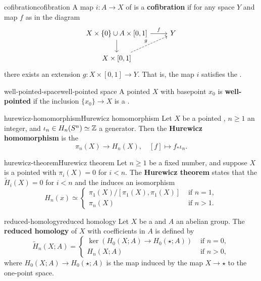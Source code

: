\begin{topic}{cofibration}{cofibration}
    A map $i : A \to X$ of  is a \textbf{cofibration} if for any space $Y$ and map $f$ as in the diagram
    \[ \begin{tikzcd} X \times \{ 0 \} \cup A \times [0, 1] \arrow{r}{f} \arrow{d} & Y \\ X \times [0, 1] \arrow[dashed]{ur}{g} \end{tikzcd} \]
    there exists an extension $g : X \times [0, 1] \to Y$. That is, the map $i$ satisfies the .
\end{topic}

\begin{topic}{well-pointed-space}{well-pointed space}
    A pointed  $X$ with basepoint $x_0$ is \textbf{well-pointed} if the inclusion $\{ x_0 \} \to X$ is a .
\end{topic}

\begin{topic}{hurewicz-homomorphism}{Hurewicz homomorphism}
    Let $X$ be a pointed , $n \ge 1$ an integer, and $\iota_n \in H_n(S^n) \simeq \mathbb{Z}$ a generator. Then the \textbf{Hurewicz homomorphism} is the 
    \[ \pi_n(X) \to H_n(X), \quad [f] \mapsto f_* \iota_n . \]
\end{topic}

\begin{topic}{hurewicz-theorem}{Hurewicz theorem}
    Let $n \ge 1$ be a fixed number, and suppose $X$ is a pointed  with $\pi_i(X) = 0$ for $i < n$. The \textbf{Hurewicz theorem} states that the  $\tilde{H}_i(X) = 0$ for $i < n$ and the  induces an isomorphism
    \[ H_n(x) \simeq \left\{ \begin{array}{ll} \pi_1(X) / [\pi_1(X), \pi_1(X)] & \text{ if } n = 1 , \\ \pi_n(X) & \text{ if } n > 1 . \end{array} \right. \]
\end{topic}

\begin{topic}{reduced-homology}{reduced homology}
    Let $X$ be a  and $A$ an abelian group. The \textbf{reduced homology} of $X$ with coefficients in $A$ is defined by
    \[ \tilde{H}_n(X; A) = \left\{ \begin{array}{ll} \ker(H_0(X; A) \to H_0(\star; A)) & \text{ if } n = 0 , \\ H_n(X; A) & \text{ if } n > 0 , \end{array} \right. \]
    where $H_0(X; A) \to H_0(\star; A)$ is the map induced by the map $X \to \star$ to the one-point space.
\end{topic}

